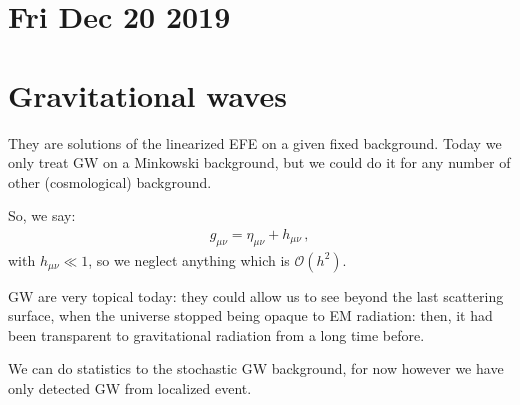 \documentclass[main.tex]{subfiles}
\begin{document}
\section*{Fri Dec 20 2019}

\section{Gravitational waves}

They are solutions of the linearized EFE on a given fixed background. Today we only treat GW on a Minkowski background, but we could do it for any number of other (cosmological) background. 

So, we say: 
%
\begin{align}
g_{\mu \nu } = \eta_{\mu \nu } + h_{\mu \nu }
\,,
\end{align}
%
with \(h_{\mu \nu } \ll 1\), so we neglect anything which is \(\mathcal{O}(h^2)\). 

GW are very topical today: they could allow us to see beyond the last scattering surface, when the universe stopped being opaque to EM radiation: then, it had been transparent to gravitational radiation from a long time before. 

We can do statistics to the stochastic GW background, for now however we have only detected GW from localized event. 
\end{document}
